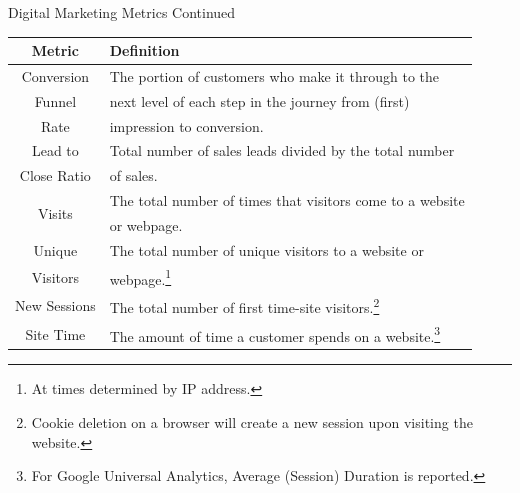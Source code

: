 \documentclass[pdf]{beamer}
\theoremstyle{remark}
\theoremstyle{definition}
\begin{document}
\begin{frame}[t]{Digital Marketing Metrics Continued}
\footnotesize
\begin{table}[htbp]
  \centering
  \captionsetup{justification=centering}
    \begin{tabular}{|c|l|}
    \toprule
    Metric & Definition \\
    \midrule
   \midrule 
   Conversion & The portion of customers who make it through to the \\
   Funnel             & next level of each step in the journey from (first)  \\
    Rate                 & impression to conversion. \\ 
    \midrule
   Lead to  &  Total number of sales leads divided by the total number \\
   Close Ratio & of sales. \\
    \midrule 
    \multirow{2}{*}{Visits} & The total number of times that visitors come to a website \\ 
   & or webpage.\\ 
   \midrule
   Unique   & The total number of unique visitors to a website or \\
    Visitors                & webpage.\footnote{At times determined by IP address.}  \\
   \midrule 
  New Sessions & The total number of first time-site visitors.\footnote{Cookie deletion on a browser will create a new session upon visiting the website.} \\
  \midrule
  Site Time & The amount of time a customer spends on a website.\footnote{For Google Universal Analytics, Average (Session) Duration is reported.} \\
  \midrule
     \end{tabular}%
  \label{tab:custmetrics}%
\end{table}%
\end{frame}
\end{document}
